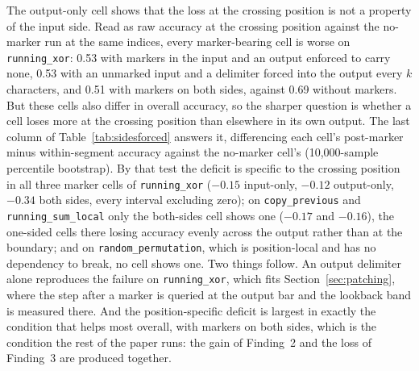 \documentclass[10pt]{article} %
\newcommand{\task}[1]{\texttt{#1}}
\begin{document}
The output-only cell shows that the loss at the crossing position is not a property of the input side. Read as raw accuracy at the crossing position against the no-marker run at the same indices, every marker-bearing cell is worse on \task{running\_xor}: 0.53 with markers in the input and an output enforced to carry none, 0.53 with an unmarked input and a delimiter forced into the output every $k$ characters, and 0.51 with markers on both sides, against 0.69 without markers. But these cells also differ in overall accuracy, so the sharper question is whether a cell loses more at the crossing position than elsewhere in its own output. The last column of Table~\ref{tab:sidesforced} answers it, differencing each cell's post-marker minus within-segment accuracy against the no-marker cell's (10,000-sample percentile bootstrap). By that test the deficit is specific to the crossing position in all three marker cells of \task{running\_xor} ($-0.15$ input-only, $-0.12$ output-only, $-0.34$ both sides, every interval excluding zero); on \task{copy\_previous} and \task{running\_sum\_local} only the both-sides cell shows one ($-0.17$ and $-0.16$), the one-sided cells there losing accuracy evenly across the output rather than at the boundary; and on \task{random\_permutation}, which is position-local and has no dependency to break, no cell shows one. Two things follow. An output delimiter alone reproduces the failure on \task{running\_xor}, which fits Section~\ref{sec:patching}, where the step after a marker is queried at the output bar and the lookback band is measured there. And the position-specific deficit is largest in exactly the condition that helps most overall, with markers on both sides, which is the condition the rest of the paper runs: the gain of Finding~2 and the loss of Finding~3 are produced together.
\end{document}
